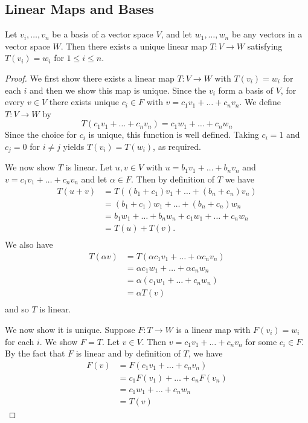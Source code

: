 \documentclass{article}
\begin{document}
\subsection{Linear Maps and Bases}
\begin{theorem}
  Let $v_i, \ldots, v_n$ be a basis of a vector space $V$, and let $w_1, \ldots, w_n$ be any vectors in a vector space $W$. Then there exists a unique linear map $T: V \to W$ satisfying $T(v_i) = w_i$ for $1 \leq i \leq n$.
\end{theorem}
\begin{proof}
  We first show there exists a linear map $T: V \to W$ with $T(v_i) = w_i$ for each $i$ and then we show this map is unique. Since the $v_i$ form a basis of $V$, for every $v \in V$ there exists unique $c_i \in F$ with $v = c_1v_1 + \dots + c_nv_n$. We define $T: V \to W$ by \[
    T(c_1v_1 + \dots + c_nv_n) = c_1w_1 + \dots + c_nw_n
  \]
  Since the choice for $c_i$ is unique, this function is well defined. Taking $c_i = 1$ and $c_j = 0$ for $i \neq j$ yields $T(v_i) = T(w_i)$, as required.

  We now show $T$ is linear. Let $u, v \in V$ with $u = b_1v_1 + \dots + b_nv_n$ and $v = c_1v_1 + \dots + c_nv_n$ and let $\alpha \in F$. Then by definition of $T$ we have
  \begin{align*}
    T(u+v) &= T((b_1 + c_1)v_1 + \dots + (b_n+c_n)v_n)\\
    &= (b_1+c_1)w_1 + \dots + (b_n + c_n)w_n\\
    &= b_1w_1 + \dots + b_nw_n + c_1w_1 + \dots + c_nw_n\\
    &= T(u) + T(v).\\
  \end{align*}
  We also have
  \begin{align*}
    T(\alpha v) &= T(\alpha c_1v_1 + \dots + \alpha c_nv_n)\\
    &= \alpha c_1w_1 + \dots + \alpha c_nw_n\\
    &= \alpha (c_1w_1 + \dots + c_nw_n)\\
    &= \alpha T(v)\\
  \end{align*}
  and so $T$ is linear.

  We now show it is unique. Suppose $F: T \to W$ is a linear map with $F(v_i) = w_i$ for each $i$. We show $F = T$. Let $v \in V$. Then $v = c_1v_1 + \dots + c_nv_n$ for some $c_i \in F$. By the fact that $F$ is linear and by definition of $T$, we have
  \begin{align*}
    F(v) &= F(c_1v_1 + \dots + c_nv_n)\\
    &= c_1F(v_1) + \dots + c_nF(v_n)\\
    &= c_1w_1 + \dots + c_nw_n\\
    &= T(v)
  \end{align*}
\end{proof}
\end{document}
